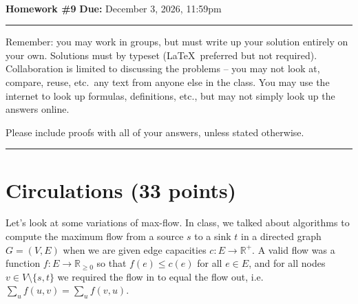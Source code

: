 \documentclass[11pt]{article}
\begin{document}
\\ 
{{\bf Homework \#9}} \hfill {{\bf Due:} December 3, 2026, 11:59pm} \\
\rule[0.1in]{\textwidth}{0.4pt}

Remember: you may work in groups, but must write up your solution entirely on your own.  Solutions must by typeset (\LaTeX\ preferred but not required).  Collaboration is limited to discussing the problems -- you may not look at, compare, reuse, etc.~any text from anyone else in the class.  You may use the internet to look up formulas, definitions, etc., but may not simply look up the answers online.  

Please include proofs with all of your answers, unless stated otherwise.


\noindent \rule[0.1in]{\textwidth}{0.4pt}

\section{Circulations (33 points)}

Let's look at some variations of max-flow.  In class, we talked about algorithms to compute the maximum flow from a source $s$ to a sink $t$ in a directed graph $G= (V, E)$ when we are given edge capacities $c : E \rightarrow \mathbb{R^+}$.  A valid flow was a function $f : E \rightarrow \mathbb{R}_{\geq 0}$ so that $f(e) \leq c(e)$ for all $e \in E$, and for all nodes $v \in V \setminus\{s,t\}$ we required the flow in to equal the flow out, i.e.~$\sum_{u} f(u,v) = \sum_{u} f(v,u)$.  
\end{document}
